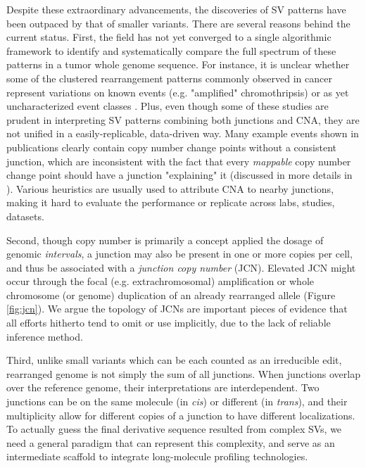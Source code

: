 \documentclass[phd,tocprelim]{cornell}
\begin{document}
Despite these extraordinary advancements, the discoveries of SV patterns have been outpaced by that of smaller variants. There are several reasons behind the current status. First, the field has not yet converged to a single algorithmic framework to identify and systematically compare the full spectrum of these patterns in a tumor whole genome sequence. For instance, it is unclear whether some of the clustered rearrangement patterns commonly observed in cancer represent variations on known events (e.g. "amplified" chromothripsis) or as yet uncharacterized event classes \cite{pcawg_marker2020-yi, Li2020sv}. Plus, even though some of these studies are prudent in interpreting SV patterns combining both junctions and CNA, they are not unified in a easily-replicable, data-driven way. Many example events shown in publications clearly contain copy number change points without a consistent junction, which are inconsistent with the fact that every \textit{mappable} copy number change point should have a junction "explaining" it (discussed in more details in \cite{Behr2021-gf}). Various heuristics are usually used to attribute CNA to nearby junctions, making it hard to evaluate the performance or replicate across labs, studies, datasets.

Second, though copy number is primarily a concept applied the dosage of genomic \textit{intervals}, a junction may also be present in one or more copies per cell, and thus be associated with a \textit{junction copy number} (JCN). Elevated JCN might occur through the focal (e.g. extrachromosomal) amplification \cite{Verhaak2019,Wu2019-ap} or whole chromosome (or genome) duplication of an already rearranged allele (Figure \ref{fig:jcn}). We argue the topology of JCNs are important pieces of evidence that all efforts hitherto tend to omit or use implicitly, due to the lack of reliable inference method.

Third, unlike small variants which can be each counted as an irreducible edit, rearranged genome is not simply the sum of all junctions. When junctions overlap over the reference genome, their interpretations are interdependent. Two junctions can be on the same molecule (in \textit{cis}) or different (in \textit{trans}), and their multiplicity allow for different copies of a junction to have different localizations. To actually guess the final derivative sequence resulted from complex SVs, we need a general paradigm that can represent this complexity, and serve as an intermediate scaffold to integrate long-molecule profiling technologies.
\end{document}
